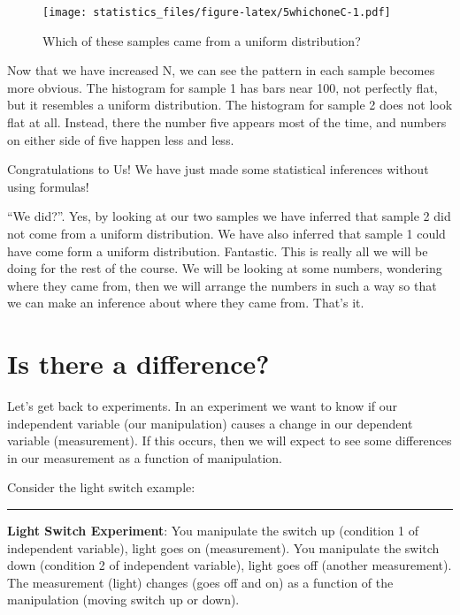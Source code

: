 \documentclass[]{book}
\begin{document}
\begin{figure}
\centering
\texttt{[image: statistics\_files/figure-latex/5whichoneC-1.pdf]}
\caption{\label{fig:5whichoneC}Which of these samples came from a uniform distribution?}
\end{figure}

Now that we have increased N, we can see the pattern in each sample becomes more obvious. The histogram for sample 1 has bars near 100, not perfectly flat, but it resembles a uniform distribution. The histogram for sample 2 does not look flat at all. Instead, there the number five appears most of the time, and numbers on either side of five happen less and less.

Congratulations to Us! We have just made some statistical inferences without using formulas!

``We did?''. Yes, by looking at our two samples we have inferred that sample 2 did not come from a uniform distribution. We have also inferred that sample 1 could have come form a uniform distribution. Fantastic. This is really all we will be doing for the rest of the course. We will be looking at some numbers, wondering where they came from, then we will arrange the numbers in such a way so that we can make an inference about where they came from. That's it.

\hypertarget{is-there-a-difference}{%
\section{Is there a difference?}\label{is-there-a-difference}}

Let's get back to experiments. In an experiment we want to know if our independent variable (our manipulation) causes a change in our dependent variable (measurement). If this occurs, then we will expect to see some differences in our measurement as a function of manipulation.

Consider the light switch example:

\begin{center}\rule{0.5\linewidth}{0.5pt}\end{center}

\textbf{Light Switch Experiment}: You manipulate the switch up (condition 1 of independent variable), light goes on (measurement). You manipulate the switch down (condition 2 of independent variable), light goes off (another measurement). The measurement (light) changes (goes off and on) as a function of the manipulation (moving switch up or down).
\end{document}
